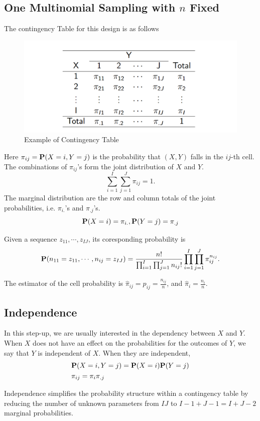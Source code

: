\subsection{One Multinomial Sampling with $n$ Fixed}
The contingency Table for this design is as follows
\begin{figure}[H]
	\centering
	\includegraphics[width=0.7\linewidth]{fig/screenshot002}
	\caption{Example of Contingency Table}
	\label{fig:screenshot002}
\end{figure}

Here $\pi_{ij} = \P(X = i, Y = j)$ is the probability that $(X, Y)$ falls in the $ij$-th cell. The combinations of $\pi_{ij}$'s form the joint distribution of $X$ and $Y$.
\[\sum_{i=1}^{I} \sum_{j=1}^{J} \pi_{ij} = 1.\]
The marginal distribution are the row and column totals of the joint probabilities, i.e. $\pi_{i.}$'s and $\pi_{.j}$'s.
\[\P(X = i) = \pi_{i.}, \P(Y = j) = \pi_{.j}\]

Given a sequence $z_{11}, \cdots, z_{IJ}$, its coresponding probability is 
\[\P(n_{11} = z_{11}, \cdots, n_{ij} = z_{IJ}) = \frac{n!}{\prod_{i = 1}^{I} \prod_{j=1}^{J} n_{ij}!} \prod_{i=1}^{I} \prod_{j=1}^{J} \pi_{ij}^{n_{ij}}.\]

The estimator of the cell probability is $\hat{\pi}_{ij} = p_{ij} = \frac{n_{ij}}{n}$, and $\hat{\pi}_i = \frac{n_i}{n}$.

\subsection{Independence}
In this step-up, we are usually interested in the dependency between $X$ and $Y$. When $X$ does not have an effect on the probabilities for the
outcomes of $Y$, we say that $Y$ is independent of $X$.
When they are independent,
\begin{align*}
	&\P(X = i, Y = j) = \P(X = i) \P(Y =j)\\
	&\pi_{ij} = \pi_i \pi_{.j}
\end{align*}

Independence simplifies the probability structure within a
contingency table by reducing the number of unknown
parameters from $IJ$ to $I - 1 + J - 1 = I + J - 2$ marginal
probabilities.